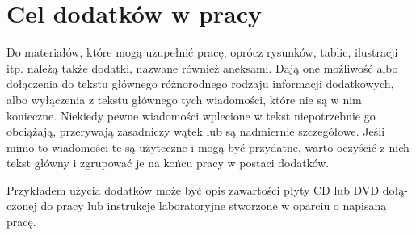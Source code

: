 \chapter{Cel dodatków w pracy}
Do materiałów, które mogą uzupełnić pracę, oprócz rysunków, tablic, ilustracji
itp. należą także dodatki, nazwane również aneksami. Dają one możliwość albo
dołączenia do tekstu głównego różnorodnego rodzaju informacji dodatkowych, albo
wyłączenia z tekstu głównego tych wiadomości, które nie są w nim konieczne. Niekiedy
pewne wiadomości wplecione w tekst niepotrzebnie go obciążają, przerywają
zasadniczy wątek lub są nadmiernie szczegółowe. Jeśli mimo to wiadomości te są
użyteczne i mogą być przydatne, warto oczyścić z nich tekst główny i zgrupować je
na końcu pracy w postaci dodatków.

Przykładem użycia dodatków może być opis zawartości płyty CD lub DVD dołą-
czonej do pracy lub instrukcje laboratoryjne stworzone w oparciu o napisaną pracę.

